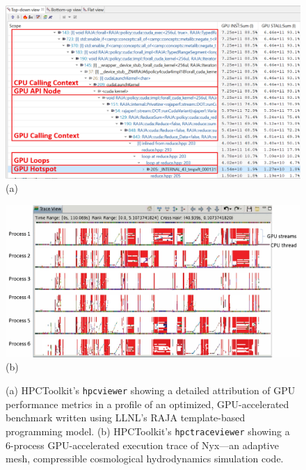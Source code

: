 \begin{figure}[t]
\captionsetup{width=.96\textwidth}
\begin{minipage}[t]{.48\textwidth}
\centering
\includegraphics[width=\textwidth]{projects/2.3.2-Tools/2.3.2.08-HPCToolkit/hpctoolkit-raja-perf}
\\(a)
\end{minipage}
\hfill
\begin{minipage}[t]{.48\textwidth}
\centering
\includegraphics[width=\textwidth]{projects/2.3.2-Tools/2.3.2.08-HPCToolkit/hpctoolkit-nyx-trace}
\\(b)
\end{minipage}
\caption{(a) 
HPCToolkit's {\tt hpcviewer} showing a detailed attribution of GPU performance metrics in a 
profile of an optimized, GPU-accelerated benchmark written using LLNL's RAJA template-based programming model.
(b) HPCToolkit's {\tt hpctraceviewer} showing a 6-process GPU-accelerated execution trace of Nyx---an adaptive mesh, compressible cosmological hydrodynamics simulation code.}
\label{fig:hpctoolkit}
\end{figure}

